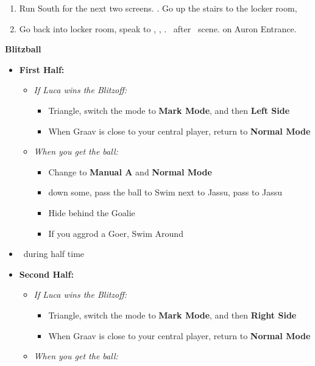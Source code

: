 \begin{enumerate}[resume]
  \item Run South for the next two screens. \save. Go up the stairs to the locker room, \sd
  \item Go back into locker room, speak to \wakka, \sd, \cs[1:20]. \sd\ after \lulu\ scene. \cs[1:40] on Auron Entrance.
\end{enumerate}
\begin{trial}
  \textbf{Blitzball}
  \begin{itemize}
  \item \textbf{First Half:}
  \begin{itemize}
    \item \textit{If Luca wins the Blitzoff:}
          \begin{itemize}
            \item Triangle, switch the mode to \textbf{Mark Mode}, and then \textbf{Left Side}
            \item When Graav is close to your central player, return to \textbf{Normal Mode}
          \end{itemize}
    \item \textit{When you get the ball:}
          \begin{itemize}
            \item Change to \textbf{Manual A} and \textbf{Normal Mode}
            \item down some, pass the ball to \tidus
            \tidusf Swim next to Jassu, pass to Jassu
            \item Hide behind the Goalie
            \item If you aggrod a Goer, Swim Around
          \end{itemize}
          \end{itemize}
    \item \sd\ during half time
    \item \textbf{Second Half:}
    	\begin{itemize}
    \item \textit{If Luca wins the Blitzoff:}
          \begin{itemize}
            \item Triangle, switch the mode to \textbf{Mark Mode}, and then \textbf{Right Side}
            \item When Graav is close to your central player, return to \textbf{Normal Mode}
          \end{itemize}
    \item \textit{When you get the ball:}

\end{itemize}
\end{itemize}
\end{trial}
